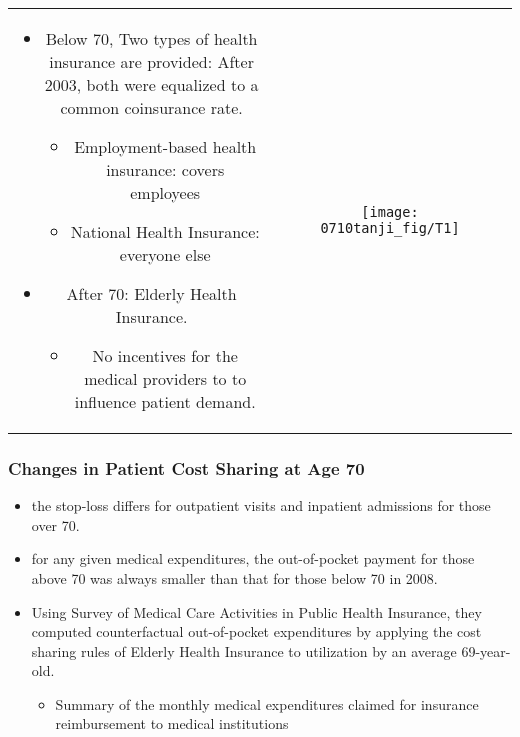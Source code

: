 \documentclass[dvipdfmx,11pt]{beamer}
\begin{document}
\begin{frame}\frametitle{}
  \begin{tabular}{cc}
    \begin{minipage}{.4\textwidth}
      \begin{itemize}
        \item Below 70, Two types of health insurance are provided: After 2003, both were equalized to a common coinsurance rate.
        \begin{itemize}
          \item Employment-based health insurance: covers employees
          \item National Health Insurance: everyone else
        \end{itemize}
        \item After 70: Elderly Health Insurance.
        \begin{itemize}
          \item No incentives for the medical providers to to influence patient demand.
        \end{itemize}
      \end{itemize}
    \end{minipage} &
    \begin{minipage}{.6\textwidth}
      \begin{figure}[ht]
        \centering
        \texttt{[image: 0710tanji\_fig/T1]}
      \end{figure}
    \end{minipage}
  \end{tabular}
\end{frame}

\begin{frame}\frametitle{Changes in Patient Cost Sharing at Age 70}
  \begin{itemize}
    \item the stop-loss differs for outpatient visits and inpatient admissions for those over 70.
    \item for any given medical expenditures, the out-of-pocket payment for those above 70 was always smaller than that for those below 70 in 2008.
    \item Using Survey of Medical Care Activities in Public Health Insurance, they computed counterfactual out-of-pocket expenditures by applying the cost sharing rules of Elderly Health Insurance to utilization by an average 69-year-old.
    \begin{itemize}
      \item Summary of the monthly medical expenditures claimed for insurance reimbursement to medical institutions
    \end{itemize}
  \end{itemize}
\end{frame}
\end{document}
